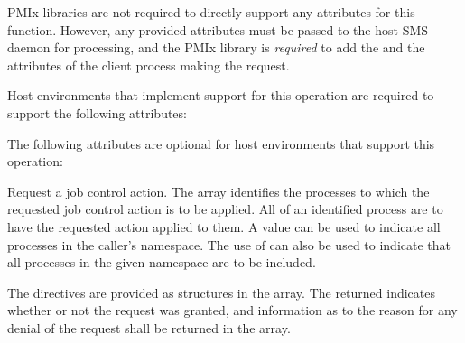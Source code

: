 \returnsimple

\reqattrstart
\ac{PMIx} libraries are not required to directly support any attributes for this function. However, any provided attributes must be passed to the host \ac{SMS} daemon for processing, and the \ac{PMIx} library is \textit{required} to add the  and the  attributes of the client process making the request.

Host environments that implement support for this operation are required to support the following attributes:


\reqattrend

\optattrstart
The following attributes are optional for host environments that support this operation:


\optattrend

\descr

Request a job control action.
The  array identifies the processes to which the requested job control action is to be applied. All  of an identified process are to have the requested action applied to them.
A  value can be used to indicate all processes in the caller's namespace.
The use of  can also be used to indicate that all processes in the given namespace are to be included.

The directives are provided as  structures in the  array.
The returned  indicates whether or not the request was granted, and information as to the reason for any denial of the request shall be returned in the  array.

